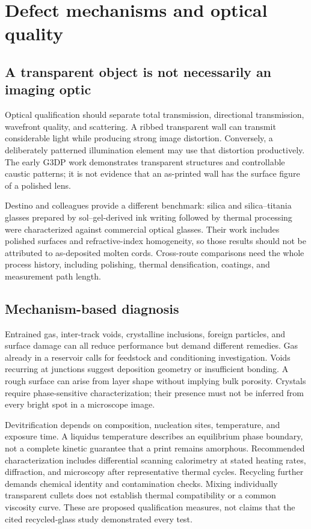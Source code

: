 \section{Defect mechanisms and optical quality}
\label{sec:defects}
\subsection{A transparent object is not necessarily an imaging optic}
Optical qualification should separate total transmission, directional transmission, wavefront quality, and scattering. A ribbed transparent wall can transmit considerable light while producing strong image distortion. Conversely, a deliberately patterned illumination element may use that distortion productively. The early G3DP work demonstrates transparent structures and controllable caustic patterns; it is not evidence that an as-printed wall has the surface figure of a polished lens.\cite{acad_klein2015}

Destino and colleagues provide a different benchmark: silica and silica--titania glasses prepared by sol--gel-derived ink writing followed by thermal processing were characterized against commercial optical glasses. Their work includes polished surfaces and refractive-index homogeneity, so those results should not be attributed to as-deposited molten cords.\cite{acad_destino2018} Cross-route comparisons need the whole process history, including polishing, thermal densification, coatings, and measurement path length.

\subsection{Mechanism-based diagnosis}
Entrained gas, inter-track voids, crystalline inclusions, foreign particles, and surface damage can all reduce performance but demand different remedies. Gas already in a reservoir calls for feedstock and conditioning investigation. Voids recurring at junctions suggest deposition geometry or insufficient bonding. A rough surface can arise from layer shape without implying bulk porosity. Crystals require phase-sensitive characterization; their presence must not be inferred from every bright spot in a microscope image.

Devitrification depends on composition, nucleation sites, temperature, and exposure time. A liquidus temperature describes an equilibrium phase boundary, not a complete kinetic guarantee that a print remains amorphous. Recommended characterization includes differential scanning calorimetry at stated heating rates, diffraction, and microscopy after representative thermal cycles. Recycling further demands chemical identity and contamination checks. Mixing individually transparent cullets does not establish thermal compatibility or a common viscosity curve. These are proposed qualification measures, not claims that the cited recycled-glass study demonstrated every test.

